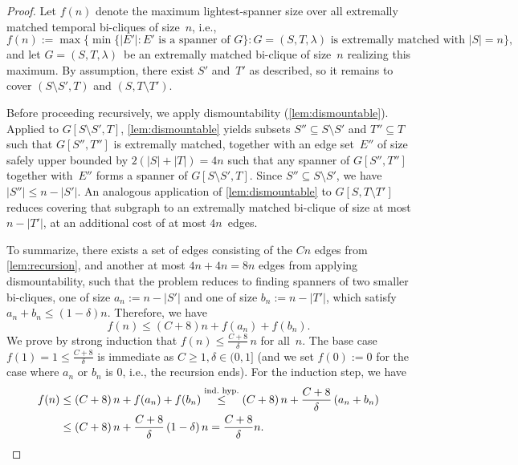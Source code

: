 \documentclass[11pt, letterpaper]{article}
\theoremstyle{definition}
\theoremstyle{plain}
\begin{document}
\begin{proof}
Let $f(n)$ denote the maximum lightest-spanner size over all extremally matched
temporal bi-cliques of size~$n$, i.e.,
\begin{equation*}
  f(n) := \max\bigl\{\min\{|E'| : E' \text{ is a spanner of } G\} :
  G=(S,T,\lambda) \text{ is extremally matched with } |S|=n\bigr\},
\end{equation*}
and let $G=(S,T,\lambda)$~be an extremally matched bi-clique of size~$n$ realizing this
maximum. By assumption, there exist $S'$ and~$T'$ as described, so it remains
to cover $(S \setminus S', T)$ and $(S, T \setminus T')$.

Before proceeding recursively, we apply dismountability (\cref{lem:dismountable}).
Applied to $G[S \setminus S', T]$, \cref{lem:dismountable} yields subsets $S'' \subseteq S \setminus S'$ and $T'' \subseteq T$ such that $G[S'',T'']$ is extremally matched, together with an edge set~$E''$ of size safely upper bounded by $2(|S|+|T|)=4n$ such that any spanner of $G[S'',T'']$ together with~$E''$ forms a spanner of $G[S \setminus S', T]$. Since $S'' \subseteq S \setminus S'$, we have $|S''| \leq n - |S'|$. 
An analogous application of \cref{lem:dismountable} to $G[S, T \setminus T']$ reduces covering that subgraph to an extremally matched bi-clique of size at most $n - |T'|$, at an additional cost of at most $4n$~edges.

To summarize, there exists a set of edges consisting of the $Cn$ edges from \cref{lem:recursion}, and another at most $4n+4n=8n$ edges from applying dismountability, such that the problem reduces to finding spanners of two smaller bi-cliques, one of size $a_n := n - |S'|$ and one of size $b_n := n - |T'|$, which satisfy
$a_n + b_n \leq (1-\delta)n$.
Therefore, we have
\begin{equation*}
  f(n) \leq (C+8)n + f(a_n) + f(b_n).
\end{equation*}
We prove by strong induction that $f(n) \leq \tfrac{C+8}{\delta}\,n$ for all~$n$. 
The base case $f(1) = 1 \leq \tfrac{C+8}{\delta}$ is immediate as $C\geq 1, \delta \in (0,1]$ (and we set $f(0):=0$ for the case where $a_n$ or $b_n$ is 0, i.e., the recursion ends).
For the induction step, we have
\begin{align*}
  f(n)
    &\leq (C+8)\,n + f(a_n) + f(b_n)
    \overset{\text{ind.~hyp.}}{\leq}
     (C+8)\,n + \frac{C+8}{\delta}\,(a_n+b_n) \\
    &\leq (C+8)\,n + \frac{C+8}{\delta}\,(1-\delta)\,n
     = \frac{C+8}{\delta} n. \qedhere
\end{align*}
\end{proof}
\end{document}
